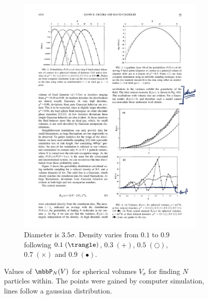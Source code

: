 \begin{figure}[H]
\begin{subfigure}[b]{0.45\textwidth}
        \includegraphics[width=\textwidth]{Inhalt/pdfs/GaussianDensityFig2.pdf}
        \caption{Diameter is $3.5\sigma$. Density varies from $0.1$ to $0.9$ following $0.1\;(\trangle)$, $0.3\;(+)$, $0.5\;(\bigcirc)$, $0.7\;(\times)$ and $0.9\;(\bullet)$.} 
        \label{fig:GaussianDensityFig2}
    \end{subfigure}
    \caption{Values of $\mbbP_N(V)$ for spherical volumes $V_\sigma$ for finding $N$ particles within. The points were gained by computer simulation, lines follow a gaussian distribution.}
    \label{fig:GaussianDensityFig}
\end{figure}

